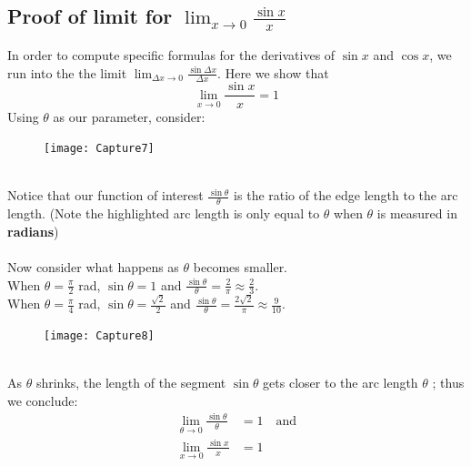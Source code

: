 \documentclass{report}
\begin{document}
\subsection{Proof of limit for $\lim_{x\to 0}\frac{\sin x}{x}$} %
In order to compute specific formulas for the derivatives of $\sin x$ and $\cos x$, we run into 
the the limit $\lim_{\Delta x\to 0}\frac{\sin\Delta x}{\Delta x}$. Here we show that
\begin{equation*}
\lim_{x\to 0}\frac{\sin x}{x}=1
\end{equation*}
Using $\theta$ as our parameter, consider:
\begin{figure}[h]
\texttt{[image: Capture7]}
\centering
{}
\end{figure}\\
Notice that our function of interest $\frac{\sin\theta}{\theta}$ is the ratio of the edge length
to the arc length.
(Note the highlighted arc length is only equal to $\theta$ when $\theta$ is measured in
\textbf{radians})\\
\vspace{2mm}\\
Now consider what happens as $\theta$ becomes smaller.\\ When $\theta=\frac{\pi}{2}$ rad,
$\sin\theta=1$ and $\frac{\sin\theta}{\theta}=\frac{2}{\pi}\approx\frac{2}{3}$.\\
When $\theta=\frac{\pi}{4}$ rad,
$\sin\theta=\frac{\sqrt{2}}{2}$ and $\frac{\sin\theta}{\theta}=\frac{2\sqrt{2}}{\pi}
\approx\frac{9}{10}$.\\
\begin{figure}[h]
\texttt{[image: Capture8]}
\centering
{}
\end{figure}\\
As $\theta$ shrinks, the length of the segment $\sin\theta$ gets closer to the arc length $\theta$
; thus we conclude:
\begin{align*}
\lim_{\theta\to 0}\frac{\sin\theta}{\theta}&=1\quad\text{and}\\
\lim_{x\to 0}\frac{\sin x}{x}&=1
\end{align*}
\newpage
\end{document}
